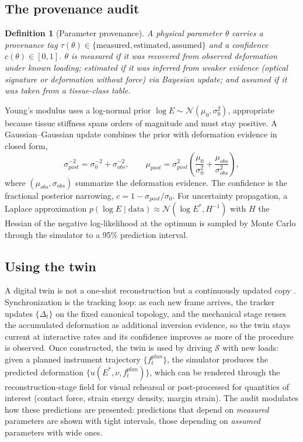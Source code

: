 \documentclass[review]{elsarticle}
\newtheorem{definition}{Definition}
\begin{document}
\subsection{The provenance audit}
\label{sec:uq}
\begin{definition}[Parameter provenance]
\label{def:provenance}
A physical parameter $\theta$ carries a provenance tag
$\tau(\theta) \in \{\text{measured}, \text{estimated}, \text{assumed}\}$ and
a confidence $c(\theta) \in [0,1]$. $\theta$ is \emph{measured} if it was
recovered from observed deformation under known loading; \emph{estimated}
if it was inferred from weaker evidence (optical signature or deformation
without force) via Bayesian update; and \emph{assumed} if it was taken from
a tissue-class table.
\end{definition}

Young's modulus uses a log-normal prior
$\log E \sim \mathcal{N}(\mu_0, \sigma_0^2)$, appropriate because tissue
stiffness spans orders of magnitude and must stay positive. A
Gaussian--Gaussian update combines the prior with deformation evidence in
closed form,
\begin{equation}
\sigma_{post}^{-2} = \sigma_0^{-2} + \sigma_{obs}^{-2}, \qquad
\mu_{post} = \sigma_{post}^{2}\left(\frac{\mu_0}{\sigma_0^{2}} + \frac{\mu_{obs}}{\sigma_{obs}^{2}}\right),
\label{eq:bayes}
\end{equation}
where $(\mu_{obs}, \sigma_{obs})$ summarize the deformation evidence. The
confidence is the fractional posterior narrowing,
$c = 1 - \sigma_{post}/\sigma_0$. For uncertainty propagation, a Laplace
approximation $p(\log E \mid \text{data}) \approx \mathcal{N}(\log E^*, H^{-1})$
with $H$ the Hessian of the negative log-likelihood at the optimum is
sampled by Monte Carlo through the simulator to a 95\% prediction interval.

\subsection{Using the twin}
\label{sec:sync}
A digital twin is not a one-shot reconstruction but a continuously updated
copy \citep{landig2025}. Synchronization is the tracking loop: as each new
frame arrives, the tracker updates $\{\Delta_t\}$ on the fixed canonical
topology, and the mechanical stage reuses the accumulated deformation as
additional inversion evidence, so the twin stays current at interactive
rates and its confidence improves as more of the procedure is observed.
Once constructed, the twin is used by driving $\mathcal{S}$ with new loads:
given a planned instrument trajectory $\{f_t^{plan}\}$, the simulator
produces the predicted deformation $\{u(E^*, \nu, f_t^{plan})\}$, which can
be rendered through the reconstruction-stage field for visual rehearsal or post-processed
for quantities of interest (contact force, strain energy density, margin
strain). The audit modulates how these predictions are presented:
predictions that depend on \emph{measured} parameters are shown with tight
intervals, those depending on \emph{assumed} parameters with wide ones.
\end{document}
